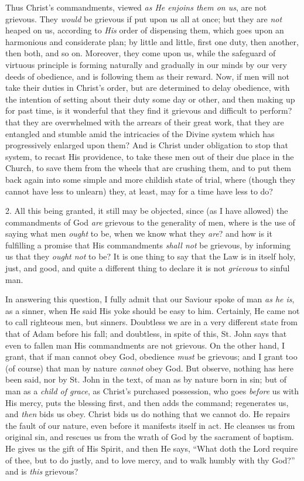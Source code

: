 Thus Christ's commandments, viewed \emph{as He enjoins
them on us}, are not grievous. They \emph{would} be
grievous if put upon us all at once; but they are \emph{not}
heaped on us, according to \emph{His} order of dispensing
them, which goes upon an harmonious and considerate plan;
by little and little, first one duty, then another, then
both, and so on. Moreover, they come upon us, while the
safeguard of virtuous principle is forming naturally and
gradually in our minds by our very deeds of obedience,
and is following them as their reward. Now, if men will
not take their duties in Christ's order, but are
determined to delay obedience, with the intention of
setting about their duty some day or other, and then
making up for past time, is it wonderful that they find
it grievous and difficult to perform? that they are
overwhelmed with the arrears of their great work, that
they are entangled and stumble amid the intricacies of
the Divine system which has progressively enlarged upon
them? And is Christ under obligation to stop that system,
to recast His providence, to take these men out of their
due place in the Church, to save them from the wheels
that are crushing them, and to put them back again into
some simple and more childish state of trial, where
(though they cannot have less to unlearn) they, at least,
may for a time have less to do?

2. All this being granted, it still may be objected,
since (as I have allowed) the commandments of God \emph{are}
grievous to the generality of men, where is the use of
saying what men \emph{ought} to be, when we know what
they \emph{are}? and how is it fulfilling a promise that
His commandments \emph{shall not} be grievous, by
informing us that they \emph{ought not} to be? It is one
thing to say that the Law is in itself holy, just, and
good, and quite a different thing to declare it is not \emph{grievous}
to sinful man.

In answering this question, I fully admit that our
Saviour spoke of man \emph{as he is}, as a sinner, when
He said His yoke should be easy to him. Certainly, He
came not to call righteous men, but sinners. Doubtless we
are in a very different state from that of Adam before
his fall; and doubtless, in spite of this, St. John says
that even to fallen man His commandments are not
grievous. On the other hand, I grant, that if man cannot
obey God, obedience \emph{must} be grievous; and I grant too (of
course) that man by nature \emph{cannot} obey God. But
observe, nothing has here been said, nor by St. John in
the text, of man as by nature born in sin; but of man as
a \emph{child of grace}, as Christ's purchased
possession, who goes \emph{before} us with His mercy,
puts the blessing first, and then adds the command;
regenerates us, and \emph{then} bids us obey. Christ bids
us do nothing that we cannot do. He repairs the fault of
our nature, even before it manifests itself in act. He
cleanses us from original sin, and rescues us from the
wrath of God by the sacrament of baptism. He gives us the
gift of His Spirit, and then He says, ``What doth the
Lord require of thee, but to do justly, and to love
mercy, and to walk humbly with thy God?'' and is \emph{this}
grievous?

